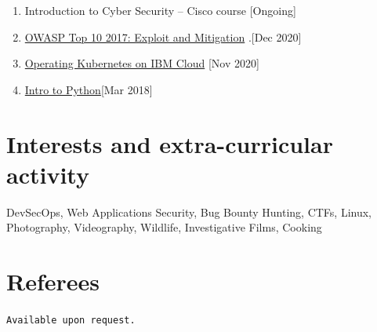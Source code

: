 \documentclass[11pt,a4paper]{moderncv}
\begin{document}
\begin{enumerate}  	
	
\item Introduction to Cyber Security { -- } Cisco course \hfill[Ongoing]

\item {\href{https://www.udemy.com/certificate/UC-ca1a3435-4c63-48cd-9905-d67d0ca89592/} {OWASP Top 10 2017: Exploit and Mitigation} }.\hfill [Dec 2020]

\item {\href{https://www.youracclaim.com/badges/35fc2e5b-aa0a-49f5-9083-8b7032c1efcb?source=linked_in_profile} {Operating Kubernetes on IBM Cloud} }\hfill [Nov 2020]

\item {\href{https://app.cybrary.it/courses/api/certificate/C-d79617a9d0-a9ae436/view}{Intro to Python}}\hfill [Mar 2018]		
\end{enumerate}

\section{Interests and extra-curricular activity}
\begin{large}
	DevSecOps, Web Applications Security, Bug Bounty Hunting, CTFs, Linux, Photography, Videography, Wildlife, Investigative Films, Cooking
\end{large}

 
	
	
	
	


\section{Referees}
\texttt{Available upon request.}
\end{document}
